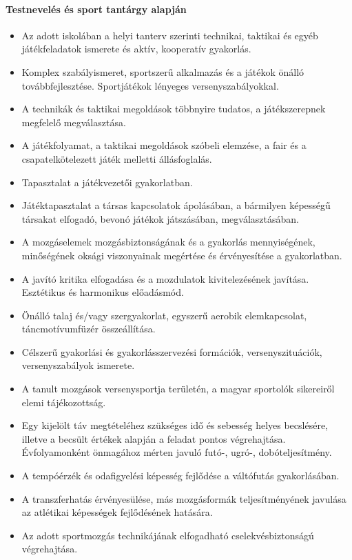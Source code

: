 \paragraph{Testnevelés és sport tantárgy alapján}
\begin{itemize}
\item Az adott iskolában a helyi tanterv szerinti technikai, taktikai és egyéb játékfeladatok ismerete és aktív, kooperatív gyakorlás.
\item Komplex szabályismeret, sportszerű alkalmazás és a játékok önálló továbbfejlesztése. Sportjátékok lényeges versenyszabályokkal.
\item A technikák és taktikai megoldások többnyire tudatos, a játékszerepnek megfelelő megválasztása.
\item A játékfolyamat, a taktikai megoldások szóbeli elemzése, a fair és a csapatelkötelezett játék melletti állásfoglalás.
\item Tapasztalat a játékvezetői gyakorlatban.
\item Játéktapasztalat a társas kapcsolatok ápolásában, a bármilyen képességű társakat elfogadó, bevonó játékok játszásában, megválasztásában.
\item A mozgáselemek mozgásbiztonságának és a gyakorlás mennyiségének, minőségének oksági viszonyainak megértése és érvényesítése a gyakorlatban.
\item A javító kritika elfogadása és a mozdulatok kivitelezésének javítása. Esztétikus és harmonikus előadásmód.
\item Önálló talaj és/vagy szergyakorlat, egyszerű aerobik elemkapcsolat, táncmotívumfüzér összeállítása.
\item Célszerű gyakorlási és gyakorlásszervezési formációk, versenyszituációk, versenyszabályok ismerete.
\item A tanult mozgások versenysportja területén, a magyar sportolók sikereiről elemi tájékozottság.
\item Egy kijelölt táv megtételéhez szükséges idő és sebesség helyes becslésére, illetve a becsült értékek alapján a feladat pontos végrehajtása. Évfolyamonként önmagához mérten javuló futó-, ugró-, dobóteljesítmény.
\item A tempóérzék és odafigyelési képesség fejlődése a váltófutás gyakorlásában.
\item A transzferhatás érvényesülése, más mozgásformák teljesítményének javulása az atlétikai képességek fejlődésének hatására.
\item Az adott sportmozgás technikájának elfogadható cselekvésbiztonságú végrehajtása.

\end{itemize}
